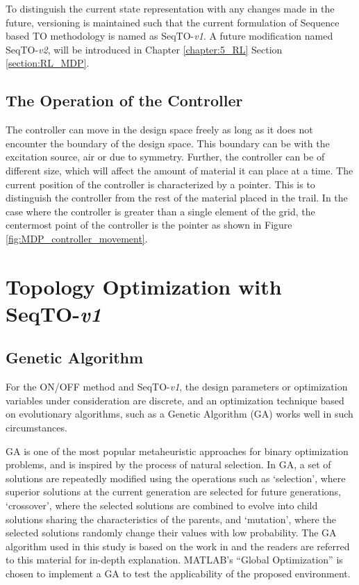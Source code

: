 To distinguish the current state representation with any changes made in the future, versioning is maintained such that the current formulation of Sequence based TO methodology is named as SeqTO-\textit{v1}. A future modification named SeqTO-\textit{v2}, will be introduced in Chapter \ref{chapter:5_RL} Section \ref{section:RL_MDP}.

\subsection{The Operation of the Controller}
The controller can move in the design space freely as long as it does not encounter the boundary of the design space. This boundary can be with the excitation source, air or due to symmetry. Further, the controller can be of different size, which will affect the amount of material it can place at a time. The current position of the controller is characterized by a pointer. This is to distinguish the controller from the rest of the material placed in the trail. In the case where the controller is greater than a single element of the grid, the centermost point of the controller is the pointer as shown in Figure \ref{fig:MDP_controller_movement}.

\section{Topology Optimization with SeqTO-\textit{v1}}

\subsection{Genetic Algorithm}
\label{section:results_GA_seqTO}

For the ON/OFF method and SeqTO-\textit{v1}, the design parameters or optimization variables under consideration are discrete, and an optimization technique based on evolutionary algorithms, such as a Genetic Algorithm (GA) works well in such circumstances.

GA is one of the most popular metaheuristic approaches for binary optimization problems, and is inspired by the process of natural selection. In GA, a set of solutions are repeatedly modiﬁed using the operations such as `selection', where superior solutions at the current generation are selected for future generations, `crossover', where the selected solutions are combined to evolve into child solutions sharing the characteristics of the parents, and `mutation', where the selected solutions randomly change their values with low probability. The GA algorithm used in this study is based on the work in \cite{midha_2018} and the readers are referred to this material for in-depth explanation. MATLAB’s “Global Optimization” \parencite{matlab, GAtoolbox} is chosen to implement a GA to test the applicability of the proposed environment. 

